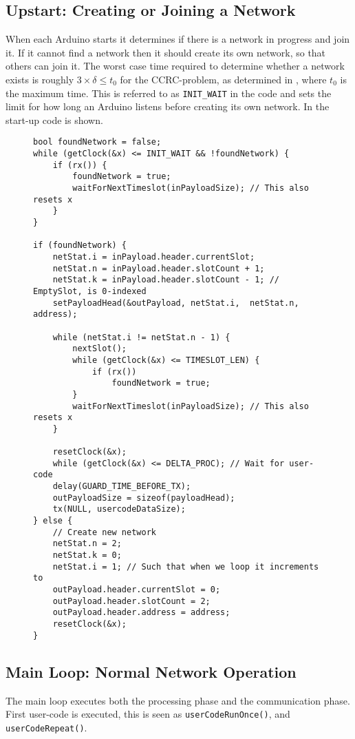 \subsection{Upstart: Creating or Joining a Network}
When each Arduino starts it determines if there is a network in progress and join it. 
If it cannot find a network then it should create its own network, so that others can join it. 
The worst case time required to determine whether a network exists is roughly $3 \times \delta \leq t_0$ for the CCRC-problem, as determined in , where $t_0$ is the maximum time. 
This is referred to as \texttt{INIT\_WAIT} in the code and sets the limit for how long an Arduino listens before creating its own network. 
In  the start-up code is shown. 
\begin{figure}
\begin{lstlisting}[style=customc,caption={Start-up, if a network is found join it, if not create one.},label={lst:ccrc:startup}]
bool foundNetwork = false;
while (getClock(&x) <= INIT_WAIT && !foundNetwork) {
    if (rx()) {
        foundNetwork = true;
        waitForNextTimeslot(inPayloadSize); // This also resets x
    }
}

if (foundNetwork) {
    netStat.i = inPayload.header.currentSlot;
    netStat.n = inPayload.header.slotCount + 1;
    netStat.k = inPayload.header.slotCount - 1; // EmptySlot, is 0-indexed
    setPayloadHead(&outPayload, netStat.i,  netStat.n, address);

    while (netStat.i != netStat.n - 1) {
        nextSlot();
        while (getClock(&x) <= TIMESLOT_LEN) {
            if (rx()) 
                foundNetwork = true;
        }
        waitForNextTimeslot(inPayloadSize); // This also resets x
    }

    resetClock(&x);
    while (getClock(&x) <= DELTA_PROC); // Wait for user-code
    delay(GUARD_TIME_BEFORE_TX);
    outPayloadSize = sizeof(payloadHead);
    tx(NULL, usercodeDataSize);
} else {
    // Create new network
    netStat.n = 2;
    netStat.k = 0;
    netStat.i = 1; // Such that when we loop it increments to
    outPayload.header.currentSlot = 0;
    outPayload.header.slotCount = 2;
    outPayload.header.address = address;
    resetClock(&x);
}
\end{lstlisting}
\end{figure}
\subsection{Main Loop: Normal Network Operation}
The main loop executes both the processing phase and the communication phase.
First user-code is executed, this is seen as \texttt{userCodeRunOnce()}, and \texttt{userCodeRepeat()}.

